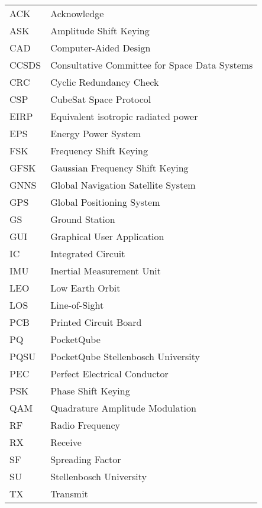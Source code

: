 \begin{tabular}{@{}p{2.5cm} l}
    ACK     & Acknowledge \\
    ASK     & Amplitude Shift Keying \\
    CAD     & Computer-Aided Design \\
    CCSDS   & Consultative Committee for Space Data Systems \\
    CRC     & Cyclic Redundancy Check \\
    CSP     & CubeSat Space Protocol \\
    EIRP    & Equivalent isotropic radiated power \\
    EPS     & Energy Power System \\
    FSK     & Frequency Shift Keying \\
    GFSK    & Gaussian Frequency Shift Keying \\
    GNNS    & Global Navigation Satellite System \\ 
    GPS     & Global Positioning System \\
    GS      & Ground Station \\
    GUI     & Graphical User Application \\
    IC      & Integrated Circuit \\
    IMU     & Inertial Measurement Unit \\
    LEO     & Low Earth Orbit \\
    LOS     & Line-of-Sight \\
    PCB     & Printed Circuit Board \\
    PQ      & PocketQube \\
    PQSU    & PocketQube Stellenbosch University \\
    PEC     & Perfect Electrical Conductor \\
    PSK     & Phase Shift Keying \\
    QAM     & Quadrature Amplitude Modulation \\
    RF      & Radio Frequency \\
    RX      & Receive \\
    SF      & Spreading Factor \\
    SU      & Stellenbosch University \\
    TX      & Transmit \\
\end{tabular}
